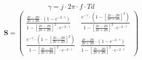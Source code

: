 \[ \gamma =  j \cdot 2 \pi \cdot f \cdot Td \]
\[ \mathbf{S} = \left(\begin{array}{cc}  \frac{  \frac{ Zc-Z0 }{ Zc +
Z0 } \cdot \left( 1 - e^{-2 \cdot \gamma }  \right) }{ 1 - \left[
\frac{ Zc-Z0 }{ Zc + Z0 } \right]^2 \cdot e^{-2 \cdot \gamma }  } &
\frac{ e^{-\gamma} \cdot \left( 1 - \left[  \frac{ Zc-Z0 }{ Zc + Z0 }
\right] ^2 \right) }{ 1 - \left[  \frac{ Zc-Z0 }{ Zc + Z0 } \right]^2
\cdot e^{-2 \cdot \gamma }  }  \\  \frac{ e^{-\gamma} \cdot \left( 1 -
\left[  \frac{ Zc-Z0 }{ Zc + Z0 } \right] ^2 \right) }{ 1 - \left[
\frac{ Zc-Z0 }{ Zc + Z0 } \right]^2 \cdot e^{-2 \cdot \gamma }  }  &
\frac{  \frac{ Zc-Z0 }{ Zc + Z0 } \cdot \left( 1 - e^{-2 \cdot \gamma
}  \right) }{ 1 - \left[  \frac{ Zc-Z0 }{ Zc + Z0 } \right]^2 \cdot
e^{-2 \cdot \gamma }  } \end{array}\right) \]
